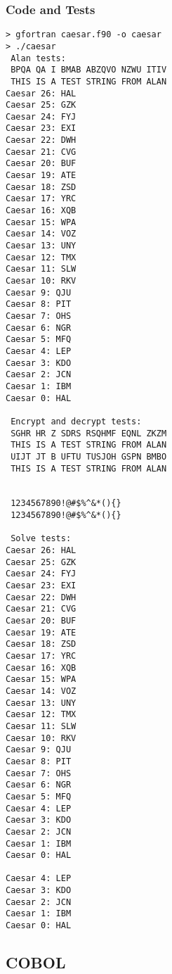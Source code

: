 \documentclass[letterpaper, 10pt, DIV=13]{scrartcl}
\numberwithin{equation}{section}
\numberwithin{figure}{section}
\numberwithin{table}{section}
\begin{document}
\subsubsection{Code and Tests}

\begin{lstlisting}[frame=single, caption = Fortran Output]  
> gfortran caesar.f90 -o caesar
> ./caesar
 Alan tests:
 BPQA QA I BMAB ABZQVO NZWU ITIV
 THIS IS A TEST STRING FROM ALAN
Caesar 26: HAL
Caesar 25: GZK
Caesar 24: FYJ
Caesar 23: EXI
Caesar 22: DWH
Caesar 21: CVG
Caesar 20: BUF
Caesar 19: ATE
Caesar 18: ZSD
Caesar 17: YRC
Caesar 16: XQB
Caesar 15: WPA
Caesar 14: VOZ
Caesar 13: UNY
Caesar 12: TMX
Caesar 11: SLW
Caesar 10: RKV
Caesar 9: QJU
Caesar 8: PIT
Caesar 7: OHS
Caesar 6: NGR
Caesar 5: MFQ
Caesar 4: LEP
Caesar 3: KDO
Caesar 2: JCN
Caesar 1: IBM
Caesar 0: HAL
	
 Encrypt and decrypt tests:
 SGHR HR Z SDRS RSQHMF EQNL ZKZM
 THIS IS A TEST STRING FROM ALAN
 UIJT JT B UFTU TUSJOH GSPN BMBO
 THIS IS A TEST STRING FROM ALAN
							
							
 1234567890!@#$%^&*(){}         
 1234567890!@#$%^&*(){}

 Solve tests:
Caesar 26: HAL
Caesar 25: GZK
Caesar 24: FYJ
Caesar 23: EXI
Caesar 22: DWH
Caesar 21: CVG
Caesar 20: BUF
Caesar 19: ATE
Caesar 18: ZSD
Caesar 17: YRC
Caesar 16: XQB
Caesar 15: WPA
Caesar 14: VOZ
Caesar 13: UNY
Caesar 12: TMX
Caesar 11: SLW
Caesar 10: RKV
Caesar 9: QJU
Caesar 8: PIT
Caesar 7: OHS
Caesar 6: NGR
Caesar 5: MFQ
Caesar 4: LEP
Caesar 3: KDO
Caesar 2: JCN
Caesar 1: IBM
Caesar 0: HAL
	
Caesar 4: LEP
Caesar 3: KDO
Caesar 2: JCN
Caesar 1: IBM
Caesar 0: HAL
\end{lstlisting}

\subsection{COBOL}
\end{document}

